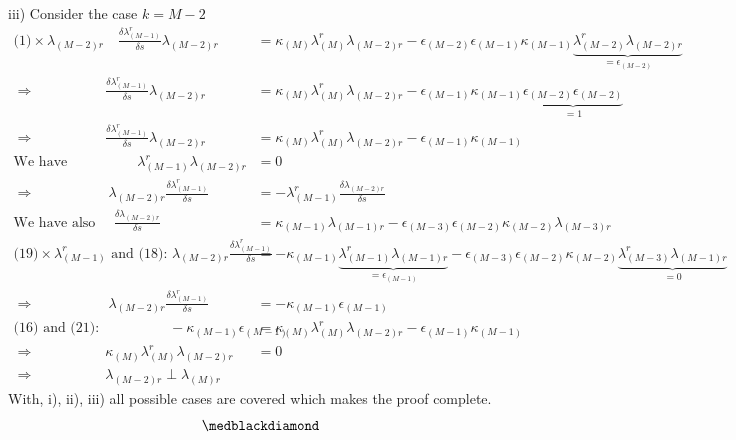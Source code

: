 iii) Consider the case $k = M-2$\\\begin{align}
\text{(1)}\times \lambda_{(M-2)r}\quad \frac{\delta\lambda_{(M-1)}^r}{\delta s}\lambda_{(M-2)r} &= \kappa_{(M)}\lambda^r_{(M)}\lambda_{(M-2)r} - \epsilon_{(M-2)}\epsilon_{(M-1)}\kappa_{(M-1)}\underbrace{\lambda^r_{(M-2)}\lambda_{(M-2)r}}_{=\epsilon_{(M-2)}}\\
\Rightarrow \quad \quad\quad\quad\quad\frac{\delta\lambda_{(M-1)}^r}{\delta s}\lambda_{(M-2)r} &= \kappa_{(M)}\lambda^r_{(M)}\lambda_{(M-2)r} - \epsilon_{(M-1)}\kappa_{(M-1)}\underbrace{\epsilon_{(M-2)}\epsilon_{(M-2)}}_{=1}\\
\Rightarrow \quad \quad\quad\quad\quad\frac{\delta\lambda_{(M-1)}^r}{\delta s}\lambda_{(M-2)r} &= \kappa_{(M)}\lambda^r_{(M)}\lambda_{(M-2)r} - \epsilon_{(M-1)}\kappa_{(M-1)}\\
\text{We have}  \quad \quad\quad\quad\quad\lambda_{(M-1)}^r\lambda_{(M-2)r} &=0\\
\Rightarrow \quad \quad\quad\quad\quad\ \lambda_{(M-2)r}\frac{\delta\lambda_{(M-1)}^r}{\delta s} &= -\lambda_{(M-1)}^r\frac{\delta\lambda_{(M-2)r}}{\delta s}\\
\text{We have also }  \quad\frac{\delta\lambda_{(M-2)r}}{\delta s} &= \kappa_{(M-1)}\lambda_{(M-1)r} - \epsilon_{(M-3)}\epsilon_{(M-2)}\kappa_{(M-2)}\lambda_{(M-3)r}\\
\text{(19)}\times \lambda^r_{(M-1)} \text{ and (18): }  \lambda_{(M-2)r}\frac{\delta\lambda_{(M-1)}^r}{\delta s} &= -\kappa_{(M-1)}\underbrace{\lambda^r_{(M-1)}\lambda_{(M-1)r}}_{=\epsilon_{(M-1)}} - \epsilon_{(M-3)}\epsilon_{(M-2)}\kappa_{(M-2)}\underbrace{\lambda^r_{(M-3)}\lambda_{(M-1)r}}_{=0}\\
\Rightarrow \quad \quad\quad\quad\quad\ \lambda_{(M-2)r}\frac{\delta\lambda_{(M-1)}^r}{\delta s} &= -\kappa_{(M-1)}\epsilon_{(M-1)}\\
\text{(16) and (21):}\quad \quad\quad\quad\quad -\kappa_{(M-1)}\epsilon_{(M-1)} &= \kappa_{(M)}\lambda^r_{(M)}\lambda_{(M-2)r} - \epsilon_{(M-1)}\kappa_{(M-1)}\\
\Rightarrow \quad \quad\quad\quad\quad \kappa_{(M)}\lambda^r_{(M)}\lambda_{(M-2)r}&=0\\
\Rightarrow \quad \quad\quad\quad\quad \lambda_{(M-2)r}\perp\lambda_{(M)r}
\end{align}
With, i), ii), iii) all possible cases are covered which makes the proof complete.
$$\medblackdiamond$$
\newpage

